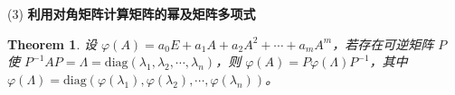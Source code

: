 \documentclass[UTF8]{ctexart}
\newtheorem{theorem}{Theorem}
\begin{document}
\begin{itemize}
		(3) \textbf{利用对角矩阵计算矩阵的幂及矩阵多项式}  
		\begin{theorem}
			设 \(\varphi(A) = a_0E + a_1A + a_2A^2 + \cdots + a_mA^m\)，若存在可逆矩阵 \(P\) 使 \(P^{-1}AP = \Lambda = \text{diag}(\lambda_1, \lambda_2, \cdots, \lambda_n)\)，则 \(\varphi(A) = P\varphi(\Lambda)P^{-1}\)，其中 \(\varphi(\Lambda) = \text{diag}(\varphi(\lambda_1), \varphi(\lambda_2), \cdots, \varphi(\lambda_n))\)。
		\end{theorem}
	\end{itemize}
	
\end{document}
